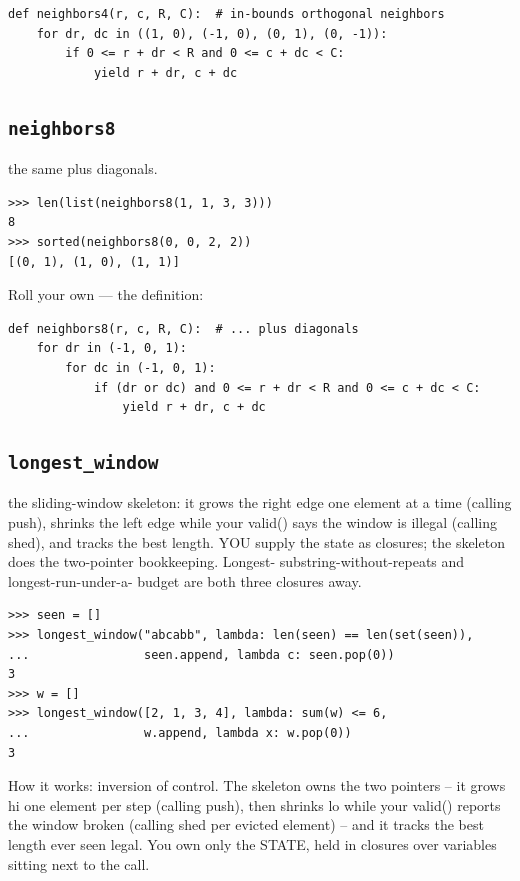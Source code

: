 \documentclass[10pt,letterpaper]{book}
\begin{document}
\begin{lstlisting}[style=ex]
def neighbors4(r, c, R, C):  # in-bounds orthogonal neighbors
    for dr, dc in ((1, 0), (-1, 0), (0, 1), (0, -1)):
        if 0 <= r + dr < R and 0 <= c + dc < C:
            yield r + dr, c + dc
\end{lstlisting}
\subsection{\texttt{neighbors8}}\label{def:neighbors8}
the same plus diagonals.
\begin{lstlisting}[style=ex]
>>> len(list(neighbors8(1, 1, 3, 3)))
8
>>> sorted(neighbors8(0, 0, 2, 2))
[(0, 1), (1, 0), (1, 1)]
\end{lstlisting}

Roll your own --- the definition:

\begin{lstlisting}[style=ex]
def neighbors8(r, c, R, C):  # ... plus diagonals
    for dr in (-1, 0, 1):
        for dc in (-1, 0, 1):
            if (dr or dc) and 0 <= r + dr < R and 0 <= c + dc < C:
                yield r + dr, c + dc
\end{lstlisting}
\subsection{\texttt{longest\_window}}\label{def:longest-window}
the sliding-window skeleton: it grows the right edge one element at a time (calling push), shrinks the left edge while your valid() says the window is illegal (calling shed), and tracks the best length. YOU supply the state as closures; the skeleton does the two-pointer bookkeeping. Longest- substring-without-repeats and longest-run-under-a- budget are both three closures away.
\begin{lstlisting}[style=ex]
>>> seen = []
>>> longest_window("abcabb", lambda: len(seen) == len(set(seen)),
...                seen.append, lambda c: seen.pop(0))
3
>>> w = []
>>> longest_window([2, 1, 3, 4], lambda: sum(w) <= 6,
...                w.append, lambda x: w.pop(0))
3
\end{lstlisting}

How it works: inversion of control. The skeleton owns the two pointers -- it grows hi one element per step (calling push), then shrinks lo while your valid() reports the window broken (calling shed per evicted element) -- and it tracks the best length ever seen legal. You own only the STATE, held in closures over variables sitting next to the call.
\end{document}
